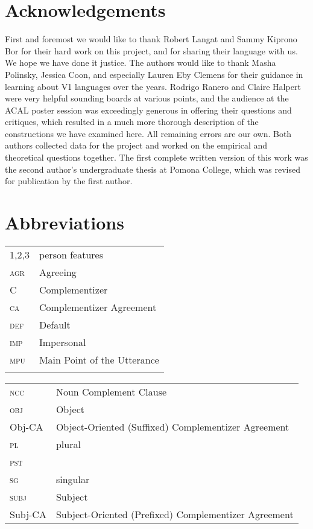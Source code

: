 \documentclass[output=paper
,newtxmath
,modfonts
,nonflat]{langsci/langscibook}
\begin{document}
\section*{Acknowledgements}
First and foremost we would like to thank Robert Langat and Sammy Kiprono Bor for their hard work on this project, and for sharing their language with us. We hope we have done it justice. The authors would like to thank Masha Polinsky, Jessica Coon, and especially Lauren Eby Clemens for their guidance in learning about V1 languages over the years. Rodrigo Ranero and Claire Halpert were very helpful sounding boards at various points, and the audience at the ACAL poster session was exceedingly generous in offering their questions and critiques, which resulted in a much more thorough description of the constructions we have examined here. All remaining errors are our own. Both authors collected data for the project and worked on the empirical and theoretical questions together. The first complete written version of this work was the second author's undergraduate thesis at Pomona College, which was revised for publication by the first author. 

\newpage

\section*{Abbreviations}
 
 
 
 \begin{tabularx}{.45\textwidth}{lQ}
   1,2,3 & person features  \\
   \textsc{agr} & Agreeing \\
   C & Complementizer \\
   \textsc{ca} & Complementizer Agreement \\
   \textsc{def} & Default \\
   \textsc{imp} & Impersonal \\ 
   \textsc{mpu} & Main Point of the Utterance \\  
   \\
 \end{tabularx}
 \begin{tabularx}{.54\textwidth}{lQ}
   \textsc{ncc} & Noun Complement Clause \\   
   \textsc{obj} & Object \\
   Obj-CA & Object-Oriented (Suffixed) Complementizer Agreement \\
   \textsc{pl} & plural \\
   \textsc{pst} &  \\
   \textsc{sg} & singular \\
   \textsc{subj} & Subject \\
   Subj-CA & Subject-Oriented (Prefixed) Complementizer Agreement \\
 \end{tabularx} 

\sloppy
\printbibliography[heading=subbibliography,notkeyword=this]
\end{document}
